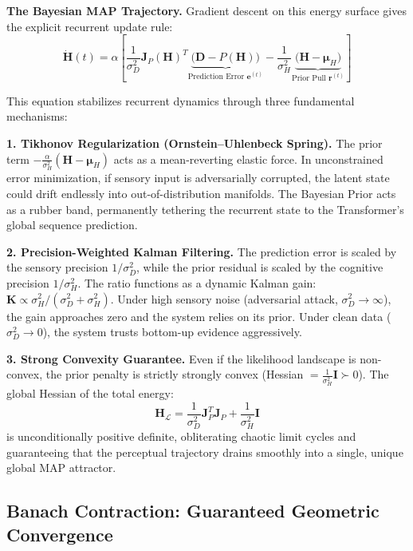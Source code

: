 \documentclass[12pt,a4paper]{article}
\begin{document}
\textbf{The Bayesian MAP Trajectory.} Gradient descent on this energy surface
gives the explicit recurrent update rule:
\begin{equation}
  \dot{\mathbf{H}}(t) = \alpha \left[
  \frac{1}{\sigma_D^2} \mathbf{J}_P(\mathbf{H})^T
  \underbrace{\big( \mathbf{D} - P(\mathbf{H}) \big)}_{\text{Prediction Error } \mathbf{e}^{(t)}}
  - \frac{1}{\sigma_H^2}
  \underbrace{\big( \mathbf{H} - \bm{\mu}_H \big)}_{\text{Prior Pull } \mathbf{r}^{(t)}}
  \right]
  \label{eq:map_trajectory}
\end{equation}

This equation stabilizes recurrent dynamics through three fundamental
mechanisms:

\textbf{1. Tikhonov Regularization (Ornstein--Uhlenbeck Spring).}
The prior term $-\frac{\alpha}{\sigma_H^2}(\mathbf{H} - \bm{\mu}_H)$ acts
as a mean-reverting elastic force. In unconstrained error minimization, if
sensory input is adversarially corrupted, the latent state could drift
endlessly into out-of-distribution manifolds. The Bayesian Prior acts as a
rubber band, permanently tethering the recurrent state to the Transformer's
global sequence prediction.

\textbf{2. Precision-Weighted Kalman Filtering.}
The prediction error is scaled by the sensory precision $1/\sigma_D^2$,
while the prior residual is scaled by the cognitive precision $1/\sigma_H^2$.
The ratio functions as a dynamic Kalman gain:
$\mathbf{K} \propto \sigma_H^2 / (\sigma_D^2 + \sigma_H^2)$.
Under high sensory noise (adversarial attack, $\sigma_D^2 \to \infty$), the
gain approaches zero and the system relies on its prior. Under clean data
($\sigma_D^2 \to 0$), the system trusts bottom-up evidence aggressively.

\textbf{3. Strong Convexity Guarantee.}
Even if the likelihood landscape is non-convex, the prior penalty is strictly
strongly convex (Hessian $= \frac{1}{\sigma_H^2}\mathbf{I} \succ 0$). The
global Hessian of the total energy:
\begin{equation}
  \mathbf{H}_{\mathcal{L}} = \frac{1}{\sigma_D^2} \mathbf{J}_P^T \mathbf{J}_P
  + \frac{1}{\sigma_H^2} \mathbf{I}
\end{equation}
is unconditionally positive definite, obliterating chaotic limit cycles and
guaranteeing that the perceptual trajectory drains smoothly into a single,
unique global MAP attractor.

\subsection{Banach Contraction: Guaranteed Geometric Convergence}
\label{sec:banach}
\end{document}
